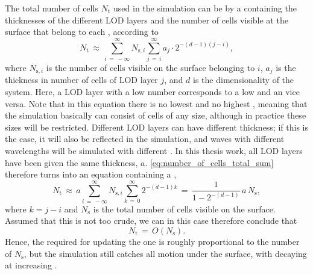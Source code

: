 The total number of cells $N_{\text{t}}$ used in the simulation can be \approximated by a  containing the thicknesses of the different LOD layers and the number of cells visible at the surface that belong to each \LOD, according to
%
\begin{equation} \label{eq:number_of_cells_total_sum}
N_{\text{t}} \,\approx\, \sum_{i\,=\,-\infty}^\infty N_{\text{s},i}\sum_{j\,=\,i}^\infty a_j\cdot 2^{-(d-1)(j-i)},
\end{equation}
%
where $N_{\text{s},i}$ is the number of cells visible on the surface belonging to  $i$, $a_j$ is the thickness in number of cells of LOD layer $j$, and $d$ is the dimensionality of the system. Here, a LOD layer with a low number corresponds to a low \LOD and an vice versa. Note that in this equation there is no lowest \LOD and no highest \LOD, meaning that the simulation basically can consist of cells of any size, although in practice these sizes will be restricted. Different LOD layers can have different thickness; if this is the case, it will also be reflected in the simulation, and waves with different wavelengths will be simulated with different \accuracy. In this thesis work, all LOD layers have been given the same thickness, $a$. \eqref{eq:number_of_cells_total_sum} therefore turns into an equation containing a ,
%
\begin{equation} \label{eq:number_of_cells_total}
N_{\text{t}} \,\approx\, a\sum_{i\,=\,-\infty}^\infty N_{\text{s},i}\sum_{k\,=\,0}^\infty 2^{-(d-1)k} \,=\, \frac{1}{1-2^{-(d-1)}}\,a\,N_{\text{s}},
\end{equation}
%
where $k = j-i$ and $N_{\text{s}}$ is the total number of cells visible on the surface. Assumed that this \approximation is not too crude, we can in this case therefore conclude that
%
\begin{equation} \label{eq:number_of_cells_total_ordo}
N_{\text{t}} \,=\, O(N_{\text{s}}).
\end{equation}
%
%
Hence, the  required for updating the  one  is roughly proportional to the number of  $N_{\text{s}}$, but the simulation still catches all motion under the surface, with decaying \accuracy at increasing .





